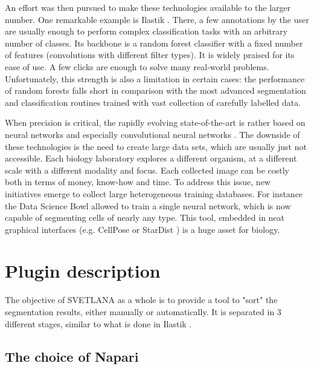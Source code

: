 \documentclass{article}
\begin{document}
An effort was then pursued to make these technologies available to the larger number. One remarkable example is Ilastik \cite{berg2019ilastik}. There, a few annotations by the user are usually enough to perform complex classification tasks with an arbitrary number of classes. Its backbone is a random forest classifier with a fixed number of features (convolutions with different filter types). It is widely praised for its ease of use. A few clicks are enough to solve many real-world problems. Unfortunately, this strength is also a limitation in certain cases: the performance of random forests falls short in comparison with the most advanced segmentation and classification routines trained with vast collection of carefully labelled data. 

When precision is critical, the rapidly evolving state-of-the-art is rather based on neural networks and especially convolutional neural networks \cite{dhillon2020convolutional,8237584}. The downside of these technologies is the need to create large data sets, which are usually just not accessible. Each biology laboratory explores a different organism, at a different scale with a different modality and focus. Each collected image can be costly both in terms of money, know-how and time. To address this issue, new initiatives emerge to collect large heterogeneous training databases. For instance the Data Science Bowl \cite{caicedo2019nucleus} allowed to train a single neural network, which is now capable of segmenting cells of nearly any type. This tool, embedded in neat graphical interfaces (e.g. CellPose \cite{stringer2021cellpose} or StarDist \cite{fazeli2020automated}) is a huge asset for biology. 


\section{Plugin description}
\label{sec:format}
{}
The objective of SVETLANA as a whole is to provide a tool to "sort" the segmentation results, either manually or automatically. 
It is separated in 3 different stages, similar to what is done in Ilastik \cite{berg2019ilastik}. 

\subsection{The choice of Napari}
\end{document}
